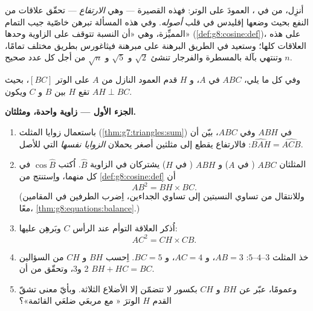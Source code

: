 \begin{problem}[{مسألة نهاية الأسبوع --- اِرتفاع المثلث القائم
الزاوية: $AB^2 = BH \times BC$ و $AH^2 = BH \times HC$، وبرهان ثانٍ
لفيثاغورس، وآلة لإنشاء الجذور التربيعية}]
\label{pb:g8:cosine:1}
أنزِل، من  في ، العمودَ
على الوتر: فهذه  القصيرة --- وهي \emph{الارتفاع} ---
تحقّق علاقات من النفع بحيث وضعها إقليدس في قلب
\emph{أصوله}. وفي هذه المسألة تبرهن خاصّية جيب التمام
المميِّزة، وهي «أن النسبة تتوقف على الزاوية وحدها»
(\cref{def:g8:cosine:def})، على هذه العلاقات كلها؛ وستعيد في الطريق
البرهنة على مبرهنة فيثاغورس بطريق مختلف تمامًا،
وتنتهي بآلة بالمسطرة والفرجار تنشئ
$\sqrt2$ و $\sqrt5$ و $\sqrt{n}$ من أجل كل عدد صحيح $n$.

وفي كل ما يلي، $ABC$  في $A$، و $H$
قدم العمود النازل من $A$ على الوتر $[BC]$،
بحيث تقع $H$ بين $B$ و $C$ ويكون $AH \perp BC$.

\medskip
\noindent\textbf{الجزء الأول --- زاوية واحدة، ومثلثان.}
\begin{enumerate}
  \item باستعمال  زوايا المثلث
        (\cref{thm:g7:triangles:sum}) في $ABH$ وفي $ABC$، بيّن
        أن $\widehat{BAH} = \widehat{ACB}$: فالارتفاع يقطع
         إلى مثلثين أصغر يحملان
        \emph{الزوايا نفسها} التي للأصل.
  \item المثلثان $ABC$ ( في $A$) و $ABH$
        ( في $H$) يشتركان في الزاوية $\widehat B$. اُكتب
        $\cos\widehat B$ في كل منهما، واِستنتج من
        \cref{def:g8:cosine:def} أن
        \[
        AB^2 = BH \times BC .
        \]
        (وللانتقال من تساوي النسبتين إلى تساوي الجداءين، اِضرب
        الطرفين في المقامين معًا،
        \cref{thm:g8:equations:balance}.)
  \item اُذكر العلاقة التوأم عند الرأس $C$ وبَرهِن عليها:
        \[
        AC^2 = CH \times CB .
        \]
  \item خذ المثلث $3$--$4$--$5$: $AB = 3$، و $AC = 4$، و
        $BC = 5$. اِحسب $BH$ و $CH$ من السؤالين 2 و3،
        وتحقّق من أن $BH + HC = BC$.
  \item وعمومًا، عبّر عن $BH$ و $CH$ بكسور لا تتضمّن
        إلا الأضلاع الثلاثة. وبأيّ معنى تشقّ القدم $H$
        الوترَ « مع مربعَي
        ضلعَي القائمة»؟
\end{enumerate}


\end{problem}
